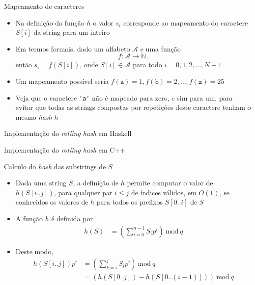 \begin{frame}[fragile]{Mapeamento de caracteres}

    \begin{itemize}
        \item Na definição da função $h$ o valor $s_i$ corresponde ao mapeamento do caractere
        $S[i]$ da string para um inteiro

        \item Em termos formais, dado um alfabeto $\mathcal{A}$ e uma função
        \[
            f : \mathcal{A} \to \mathbb{N},
        \]
        então $s_i = f(S[i])$, onde $S[i]\in\mathcal{A}$ para todo $i = 0, 1, 2, \ldots, N - 1$

        \item Um mapeamento possível seria $f(\mathtt{a}) = 1, f(\mathtt{b}) = 2, \ldots,
        f(\mathtt{z}) = 25$

        \item Veja que o caractere \texttt{`a'} não é mapeado para zero, e sim para um, para
            evitar que todas as strings compostas por repetições deste caractere tenham o 
            mesmo \textit{hash} $h$
    \end{itemize}

\end{frame}

\begin{frame}[fragile]{Implementação do {\it rolling hash} em Haskell}
\end{frame}

\begin{frame}[fragile]{Implementação do {\it rolling hash} em C++}
\end{frame}

\begin{frame}[fragile]{Calculo do {\it hash} das substrings de $S$}

    \begin{itemize}
        \item Dada uma string $S$, a definição de $h$ permite computar o valor de $h(S[i..j])$,
            para qualquer par $i\leq j$ de índices válidos, em $O(1)$, se conhecidos os valores
            de $h$ para todos os prefixos $S[0..i]$ de $S$
        
        \item A função $h$ é definida por
        \begin{align*}
        h(S) &= \left(\sum_{i=0}^{n - 1} S_ip^i\right)\ \mbox{mod}\ q
        \end{align*}

        \item Deste modo,
        \begin{align*}
        h(S[i..j])p^i &= \left(\sum_{k=i}^{j} S_ip^i\right)\ \mbox{mod}\ q \\
        &= \left(h(S[0..j]) - h(S[0..(i - 1)])\right) \ \mbox{mod}\ q
        \end{align*}
    \end{itemize}

\end{frame}

